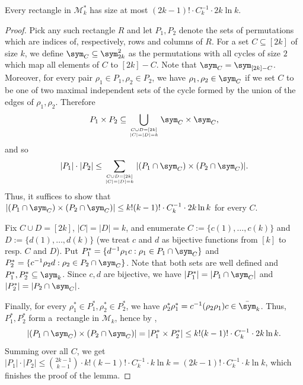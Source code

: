 \begin{lemma}\label{lem:mm*_size_bound}
    Every rectangle in $\mathcal{M}^*_k$ has size at most
    $(2k-1)! \cdot C_k^{-1} \cdot 2k \ln k$.
\end{lemma}

\begin{proof}
    Pick any such rectangle $R$ and let $P_1, P_2$ denote the sets of permutations which are indices of, respectively, rows and columns of $R$. For a set $C \subseteq [2k]$ of size $k$, we define $\sym_C \subseteq \sym_{2k}^2$ as the permutations with all cycles of size $2$ which map all elements of $C$ to $[2k] - C$. Note that $\sym_C = \sym_{[2k] - C}$. Moreover, for every pair $\rho_1 \in P_1, \rho_2 \in P_2$, we have $\rho_1, \rho_2 \in \sym_C$ if we set $C$ to be one of two maximal independent sets of the cycle formed by the union of the edges of $\rho_1, \rho_2$. Therefore
    $$
        P_1 \times P_2 \subseteq \bigcup_{C \cup D = [2k] \atop |C| = |D| = k} \sym_C \times \sym_C,
    $$
    and so
    $$
        |P_1| \cdot |P_2| \leq
        \sum_{C \cup D = [2k] \atop |C| = |D| = k}
            |(P_1 \cap \sym_C) \times (P_2 \cap \sym_C)|.
    $$
    Thus, it suffices to show that $|(P_1 \cap \sym_C) \times (P_2 \cap \sym_C)| \leq k!(k - 1)! \cdot C_k^{-1} \cdot 2k \ln k$ for every $C$.

    Fix $C \cup D = [2k]$, $|C| = |D| = k$, and enumerate $C := \{ c(1), \dots, c(k) \}$ and $D := \{ d(1), \dots, d(k) \}$ (we treat $c$ and $d$ as bijective functions from $[k]$ to resp. $C$ and $D$).
    Put $P_1^* = \{d^{-1} \rho_1 c : \rho_1 \in P_1 \cap \sym_C\}$
    and $P_2^* = \{c^{-1} \rho_2 d : \rho_2 \in P_2 \cap \sym_C \}$. Note that both sets are well defined and $P_1^*, P_2^* \subseteq \sym_k$.
    Since $c, d$ are bijective, we have $|P_1^*| = |P_1 \cap \sym_C|$ and $|P_2^*| = |P_2 \cap \sym_C|$.
    
    Finally, for every $\rho_1^* \in P^*_1, \rho_2^* \in P^*_2$, we have $\rho_2^* \rho_1^* = c^{-1} (\rho_2 \rho_1) c \in \bar\sym_k$. Thus, $P_1^*, P_2^*$ form a~rectangle in $\mathcal{M}_k$, hence by ,
    $$
        |(P_1 \cap \sym_C) \times (P_2 \cap \sym_C)| =
        |P_1^* \times P_2^*| \leq k!(k - 1)! \cdot C_k^{-1} \cdot 2k \ln k.
    $$
    Summing over all $C$, we get $|P_1| \cdot |P_2| \leq \binom{2k - 1}{k - 1} \cdot k!(k - 1)! \cdot C_k^{-1} \cdot k \ln k = (2k - 1)! \cdot C_k^{-1} \cdot k \ln k$, which finishes the proof of the lemma.
\end{proof}